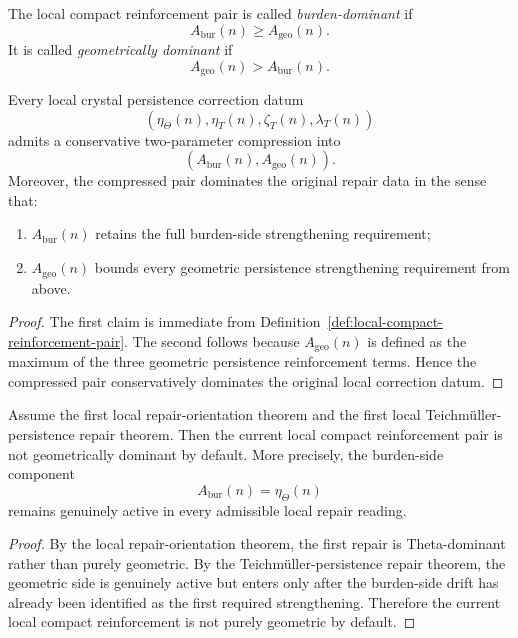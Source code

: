 \begin{definition}
\label{def:burden-dominant-compact-reinforcement}
The local compact reinforcement pair is called \emph{burden-dominant} if
\[
  A_{\mathrm{bur}}(n)\ge A_{\mathrm{geo}}(n).
\]
It is called \emph{geometrically dominant} if
\[
  A_{\mathrm{geo}}(n)>A_{\mathrm{bur}}(n).
\]
\end{definition}

\begin{proposition}
\label{prop:crystal-persistence-correction-datum-admits-two-parameter-compression}
Every local crystal persistence correction datum
\[
  (\eta_{\Theta}(n),\eta_T(n),\zeta_T(n),\lambda_T(n))
\]
admits a conservative two-parameter compression into
\[
  (A_{\mathrm{bur}}(n),A_{\mathrm{geo}}(n)).
\]
Moreover, the compressed pair dominates the original repair data in the sense that:
\begin{enumerate}[leftmargin=2em,label=(\alph*)]
  \item $A_{\mathrm{bur}}(n)$ retains the full burden-side strengthening requirement;
  \item $A_{\mathrm{geo}}(n)$ bounds every geometric persistence strengthening requirement from above.
\end{enumerate}
\end{proposition}

\begin{proof}
The first claim is immediate from Definition~\ref{def:local-compact-reinforcement-pair}.
The second follows because $A_{\mathrm{geo}}(n)$ is defined as the maximum of the three geometric persistence reinforcement terms.
Hence the compressed pair conservatively dominates the original local correction datum.
\end{proof}

\begin{proposition}
\label{prop:current-local-reinforcement-is-not-purely-geometric}
Assume the first local repair-orientation theorem and the first local Teichmüller-persistence repair theorem.
Then the current local compact reinforcement pair is not geometrically dominant by default.
More precisely, the burden-side component
\[
  A_{\mathrm{bur}}(n)=\eta_{\Theta}(n)
\]
remains genuinely active in every admissible local repair reading.
\end{proposition}

\begin{proof}
By the local repair-orientation theorem, the first repair is Theta-dominant rather than purely geometric.
By the Teichmüller-persistence repair theorem, the geometric side is genuinely active but enters only after the burden-side drift has already been identified as the first required strengthening.
Therefore the current local compact reinforcement is not purely geometric by default.
\end{proof}

